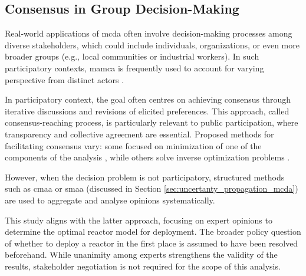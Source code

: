 \subsection{Consensus in Group Decision-Making}
\label{sec:consensus_in_dm}
Real-world applications of \gls{mcda} often involve decision-making processes among diverse stakeholders, which could include individuals, organizations, or even more broader groups (e.g.,  local communities or industrial workers). In such participatory contexts, \gls{mamca} is frequently used  to account for  varying perspective from distinct actors \cite{Huang2024}.

In participatory context, the goal often centres on achieving consensus through iterative discussions and revisions of elicited preferences. This approach, called consensus-reaching process, is particularly relevant to public participation, where transparency and collective agreement are essential.  Proposed methods for facilitating consensus vary: some focused on minimization of one of the components of the analysis \cite{4696004}, while others solve inverse optimization problems \cite{ROLAND20132764, Huang02012021}.

However, when the decision problem is not participatory, structured methods such as \gls{cmaa} or \gls{smaa} (discussed in Section \ref{sec:uncertanty_propagation_mcda}) are used to aggregate and analyse opinions systematically.  

This study aligns with the latter approach, focusing on expert opinions to determine the optimal reactor model for deployment. The broader policy question of whether to deploy a reactor in the first place is assumed to have been resolved beforehand. While unanimity among experts strengthens the validity of the results, stakeholder negotiation is not required for the scope of this analysis.